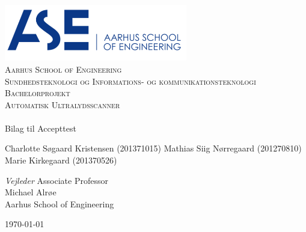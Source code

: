 \begin{titlingpage}
\begin{center}

~ \\[3cm]

\includegraphics[width=0.6\textwidth]{figurer/ASE}~\\[1cm]

\textsc{\LARGE Aarhus School of Engineering}\\[1.5cm]

\textsc{\Large Sundhedsteknologi og Informations- og kommunikationsteknologi}\\

\textsc{\Large Bachelorprojekt}\\[0.5cm]

\textsc{\Large Automatisk Ultralydsscanner} \\[1cm]

\noindent\makebox[\linewidth]{\rule{\textwidth}{0.4pt}}\\
[0.5cm]{\Huge Bilag til Accepttest}
\noindent\makebox[\linewidth]{\rule{\textwidth}{0.4pt}}

\end{center}

Charlotte Søgaard Kristensen (201371015) \newline
Mathias Siig Nørregaard  (201270810)\newline		 
Marie Kirkegaard (201370526) \newline  


\textit{Vejleder} \newline
Associate Professor\\
Michael Alrøe\\
Aarhus School of Engineering


\vfill

\begin{center}
{\large \today}
\end{center}

\end{titlingpage}